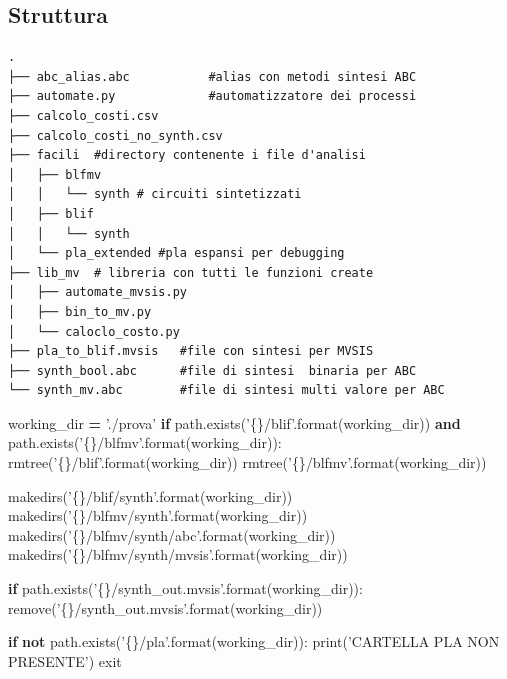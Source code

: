 \documentclass[italian,]{book}
\newenvironment{Shaded}{\begin{snugshade}}{\end{snugshade}}
\newcommand{\BuiltInTok}[1]{#1}
\newcommand{\ControlFlowTok}[1]{\textcolor[rgb]{0.13,0.29,0.53}{\textbf{#1}}}
\newcommand{\KeywordTok}[1]{\textcolor[rgb]{0.13,0.29,0.53}{\textbf{#1}}}
\newcommand{\NormalTok}[1]{#1}
\newcommand{\OperatorTok}[1]{\textcolor[rgb]{0.81,0.36,0.00}{\textbf{#1}}}
\newcommand{\SpecialCharTok}[1]{\textcolor[rgb]{0.00,0.00,0.00}{#1}}
\newcommand{\StringTok}[1]{\textcolor[rgb]{0.31,0.60,0.02}{#1}}
\begin{document}
\hypertarget{struttura}{%
\subsection{Struttura}\label{struttura}}

\begin{verbatim}
.
├── abc_alias.abc           #alias con metodi sintesi ABC
├── automate.py             #automatizzatore dei processi
├── calcolo_costi.csv
├── calcolo_costi_no_synth.csv
├── facili  #directory contenente i file d'analisi
│   ├── blfmv
│   │   └── synth # circuiti sintetizzati
│   ├── blif
│   │   └── synth
│   └── pla_extended #pla espansi per debugging
├── lib_mv  # libreria con tutti le funzioni create
│   ├── automate_mvsis.py
│   ├── bin_to_mv.py
│   └── caloclo_costo.py
├── pla_to_blif.mvsis   #file con sintesi per MVSIS
├── synth_bool.abc      #file di sintesi  binaria per ABC
└── synth_mv.abc        #file di sintesi multi valore per ABC
\end{verbatim}

\newpage

\begin{Shaded}
\begin{Highlighting}[]
\NormalTok{working_dir }\OperatorTok{=} \StringTok{'./prova'}
 \ControlFlowTok{if}\NormalTok{ path.exists(}\StringTok{'}\SpecialCharTok{\{\}}\StringTok{/blif'}\NormalTok{.}\BuiltInTok{format}\NormalTok{(working_dir)) }
    \KeywordTok{and}\NormalTok{ path.exists(}\StringTok{'}\SpecialCharTok{\{\}}\StringTok{/blfmv'}\NormalTok{.}\BuiltInTok{format}\NormalTok{(working_dir)):}
\NormalTok{        rmtree(}\StringTok{'}\SpecialCharTok{\{\}}\StringTok{/blif'}\NormalTok{.}\BuiltInTok{format}\NormalTok{(working_dir))}
\NormalTok{        rmtree(}\StringTok{'}\SpecialCharTok{\{\}}\StringTok{/blfmv'}\NormalTok{.}\BuiltInTok{format}\NormalTok{(working_dir))}
      
\NormalTok{makedirs(}\StringTok{'}\SpecialCharTok{\{\}}\StringTok{/blif/synth'}\NormalTok{.}\BuiltInTok{format}\NormalTok{(working_dir))}
\NormalTok{makedirs(}\StringTok{'}\SpecialCharTok{\{\}}\StringTok{/blfmv/synth'}\NormalTok{.}\BuiltInTok{format}\NormalTok{(working_dir))}
\NormalTok{makedirs(}\StringTok{'}\SpecialCharTok{\{\}}\StringTok{/blfmv/synth/abc'}\NormalTok{.}\BuiltInTok{format}\NormalTok{(working_dir))}
\NormalTok{makedirs(}\StringTok{'}\SpecialCharTok{\{\}}\StringTok{/blfmv/synth/mvsis'}\NormalTok{.}\BuiltInTok{format}\NormalTok{(working_dir))}

\ControlFlowTok{if}\NormalTok{ path.exists(}\StringTok{'}\SpecialCharTok{\{\}}\StringTok{/synth_out.mvsis'}\NormalTok{.}\BuiltInTok{format}\NormalTok{(working_dir)):}
\NormalTok{    remove(}\StringTok{'}\SpecialCharTok{\{\}}\StringTok{/synth_out.mvsis'}\NormalTok{.}\BuiltInTok{format}\NormalTok{(working_dir))}

\ControlFlowTok{if} \KeywordTok{not}\NormalTok{ path.exists(}\StringTok{'}\SpecialCharTok{\{\}}\StringTok{/pla'}\NormalTok{.}\BuiltInTok{format}\NormalTok{(working_dir)):}
    \BuiltInTok{print}\NormalTok{(}\StringTok{'CARTELLA PLA NON PRESENTE'}\NormalTok{)}
\NormalTok{    exit}
\end{Highlighting}
\end{Shaded}
\end{document}
